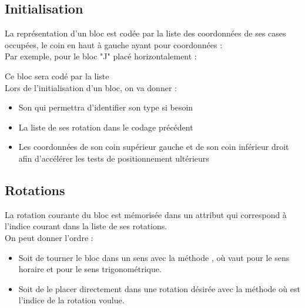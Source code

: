 \subsection{Initialisation}
La représentation d'un bloc est codée par la liste des coordonnées de ses cases occupées, le coin en haut à gauche ayant pour coordonnées  :\\
Par exemple, pour le bloc "J" placé horizontalement :


Ce bloc sera codé par la liste \pyth{[(0,0), (1,0), (1,1), (1,2)]}\\

Lors de l'initialisation d'un bloc, on va donner :
\begin{itemize}
	\item Son  qui permettra d'identifier son type si besoin
	\item La liste de ses rotation dans le codage précédent
	\item Les coordonnées de son coin supérieur gauche et de son coin inférieur droit afin d'accélérer les tests de positionnement ultérieurs
\end{itemize}

\subsection{Rotations}
La rotation courante du bloc est mémorisée dans un attribut  qui correspond à l'indice courant dans la liste de ses rotations.\\
On peut donner l'ordre :
\begin{itemize}
	\item Soit de tourner le bloc dans un sens avec la méthode , où  vaut  pour le sens horaire et  pour le sens trigonométrique.
	\item Soit de le placer directement dans une rotation désirée avec la méthode  où  est l'indice de la rotation voulue.
\end{itemize}

